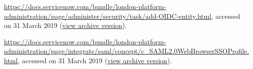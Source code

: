 \url{https://docs.servicenow.com/bundle/london-platform-administration/page/administer/security/task/add-OIDC-entity.html}, accessed on 31 March 2019 (\href{https://web.archive.org/web/20190331184433/https://docs.servicenow.com/bundle/london-platform-administration/page/administer/security/task/add-OIDC-entity.html}{view archive version}).

\url{https://docs.servicenow.com/bundle/london-platform-administration/page/integrate/saml/concept/c_SAML2.0WebBrowserSSOProfile.html}, accessed on 31 March 2019 (\href{https://web.archive.org/web/20190331184648/https://docs.servicenow.com/bundle/london-platform-administration/page/integrate/saml/concept/c_SAML2.0WebBrowserSSOProfile.html}{view archive version}).